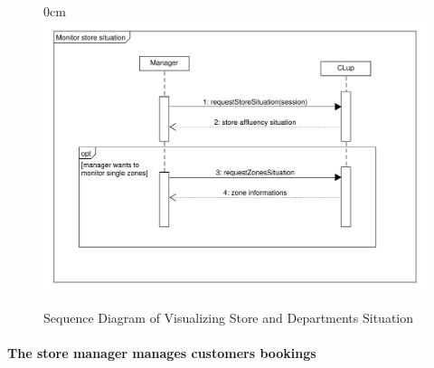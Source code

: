 \documentclass{article}
\begin{document}
\begin{center}
\begin{itemize}
				\end{itemize}
			
					\begin{figure}[!h]
						\begin{adjustwidth} {0cm}{}
							\centering
							\includegraphics[scale=0.3]{SD/8_monitorStoreSituation.pdf}\\
							\caption{Sequence Diagram of Visualizing Store and Departments Situation}
						\end{adjustwidth}
					\end{figure}
					
				\end{center}
			
			\newpage
			\paragraph{The store manager manages customers bookings}
			
\end{document}

